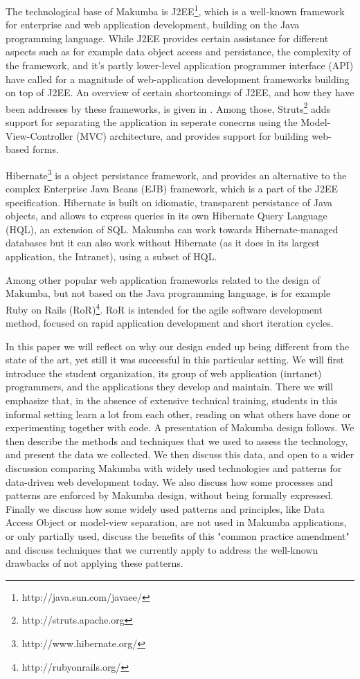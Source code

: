 \documentclass{llncs}
\begin{document}
The technological base of Makumba is J2EE\footnote{http://java.sun.com/javaee/}, which is a well-known framework for enterprise and web application development, building on the Java programming language. While J2EE provides certain assistance for different aspects such as for example data object access and persistance, the complexity of the framework, and it's partly lower-level application programmer interface (API) have called for a magnitude of web-application development frameworks building on top of J2EE. An overview of certain shortcomings of J2EE, and how they have been addresses by these frameworks, is given in \cite{johnson2005jdf}. Among those, Struts\footnote{http://struts.apache.org} adds support for separating the application in seperate conecrns using the Model-View-Controller (MVC) architecture, and provides support for building web-based forms. 

Hibernate\footnote{http://www.hibernate.org/} is a object persistance framework, and provides an alternative to the complex Enterprise Java Beans (EJB) framework, which is a part of the J2EE specification. Hibernate is built on idiomatic, transparent persistance of Java objects, and allows to express queries in its own Hibernate Query Language (HQL), an extension of SQL. Makumba can work towards Hibernate-managed databases but it can also work without Hibernate (as it does in its largest application, the Intranet), using a subset of HQL.

Among other popular web application frameworks related to the design of Makumba, but not based on the Java programming language, is for example Ruby on Rails (RoR)\footnote{http://rubyonrails.org/}. RoR is intended for the agile software development method, focused on rapid application development and short iteration cycles.

In this paper we will  reflect on why our design ended up being different from the state of the art, yet still it was successful in this particular setting. We will first introduce the student organization, its group of web application (inrtanet) programmers, and the applications they develop and maintain. There we will emphasize that, in the absence of extensive technical training, students in this informal setting learn  a lot from each other, reading on what others have done or experimenting together with code. A presentation of Makumba design follows. We then describe the methods and techniques that we used to assess the technology, and present the data we collected. We then discuss this data, and open to  a wider discussion comparing Makumba with widely used technologies and patterns for data-driven web development today. We also discuss how some processes and patterns are enforced by Makumba design, without being formally expressed. Finally we discuss how some widely used patterns and principles, like Data Access Object or model-view separation, are not used in Makumba applications, or only partially used, discuss the benefits of this "common practice amendment" and discuss techniques that we currently apply to address the well-known drawbacks of not applying these patterns.\\
\end{document}
